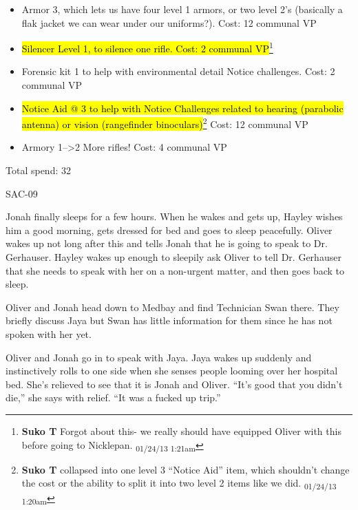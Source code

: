 \begin{itemize}
\item Armor 3, which lets us have four level 1 armors, or two level 2's (basically a flak jacket we can wear under our uniforms?).  Cost: 12 communal VP
\item \hl{Silencer Level 1, to silence one rifle. Cost: 2 communal VP}\footnote{\textbf{Suko T }Forgot about this- we really should have equipped Oliver with this before going to Nicklepan. \textsubscript{01/24/13 1:21am}}
\item Forensic kit 1 to help with environmental detail Notice challenges.  Cost: 2 communal VP
\item \hl{Notice Aid @ 3 to help with Notice Challenges related to hearing (parabolic antenna) or vision (rangefinder binoculars)}\footnote{\textbf{Suko T }collapsed into one level 3 ``Notice Aid'' item, which shouldn't change the cost or the ability to split it into two level 2 items like we did. \textsubscript{01/24/13 1:20am}}  Cost: 12 communal VP
\item Armory 1--\textgreater 2  More rifles!  Cost: 4 communal VP
\end{itemize}



Total spend: 32



\noindent\hrulefill





 {\LARGE SAC-09 } 



Jonah finally sleeps for a few hours.  When he wakes and gets up, Hayley wishes him a good morning, gets dressed for bed and goes to sleep peacefully.  Oliver wakes up not long after this and tells Jonah that he is going to speak to Dr. Gerhauser.  Hayley wakes up enough to sleepily ask Oliver to tell Dr. Gerhauser that she needs to speak with her on a non-urgent matter, and then goes back to sleep.



Oliver and Jonah head down to Medbay and find Technician Swan there.  They briefly discuss Jaya but Swan has little information for them since he has not spoken with her yet. 



Oliver and Jonah go in to speak with Jaya.  Jaya wakes up suddenly and instinctively rolls to one side when she senses people looming over her hospital bed.  She's relieved to see that it is Jonah and Oliver. ``It's good that you didn't die,'' she says with relief.  ``It was a fucked up trip.''

